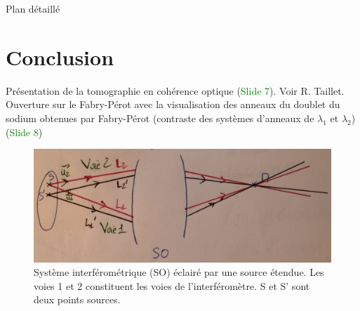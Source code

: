 \begin{reportBlock}{Plan détaillé}
  \section*{Conclusion}
  Présentation de la tomographie en cohérence optique (\textcolor{green}{Slide 7}). Voir R. Taillet.\\
  Ouverture sur le Fabry-Pérot avec la visualisation des anneaux du doublet du sodium obtenues par Fabry-Pérot (contraste des systèmes d'anneaux de $\lambda_1$ et $\lambda_2$) (\textcolor{green}{Slide 8})
\end{reportBlock}

\clearpage
  \begin{figure}[!htbp]
  \centering
  \includegraphics[scale=0.6]{LPO3/localisation.jpg}
  \caption{\label{fig:localisation}Système interférométrique (SO) éclairé par une source étendue. Les voies 1 et 2 constituent les voies de l'interféromètre. S et S' sont deux points sources.}
  \end{figure}
  
